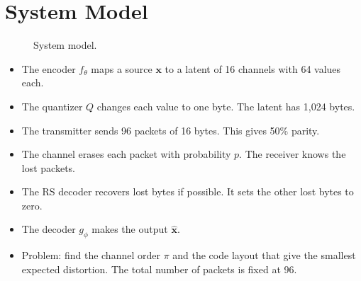 \documentclass[journal]{IEEEtran}
\begin{document}
\section{System Model}\label{sec:model}
\begin{figure}[t]\centering
{}
\caption{System model.}\label{fig:system}
\end{figure}
\begin{itemize}
\item The encoder $f_\theta$ maps a source $\mathbf{x}$ to a latent of 16 channels with 64 values each.
\item The quantizer $Q$ changes each value to one byte. The latent has 1,024 bytes.
\item The transmitter sends 96 packets of 16 bytes. This gives 50\% parity.
\item The channel erases each packet with probability $p$. The receiver knows the lost packets.
\item The RS decoder recovers lost bytes if possible. It sets the other lost bytes to zero.
\item The decoder $g_\phi$ makes the output $\hat{\mathbf{x}}$.
\item Problem: find the channel order $\pi$ and the code layout that give the smallest expected distortion.
      The total number of packets is fixed at 96.
\end{itemize}
\end{document}
